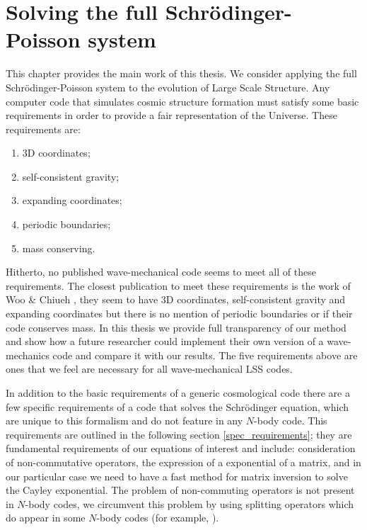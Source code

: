 %
\newpage
\chapter{Solving the full Schr\"odinger-Poisson system}
\label{ch_5}
This chapter provides the main work of this thesis. We consider applying the full Schr\"odinger-Poisson system to the evolution of Large Scale Structure. Any computer code that simulates cosmic structure formation must satisfy some basic requirements in order to provide a fair representation of the Universe. These requirements are:

\begin{enumerate}
\item 3D coordinates;
\item self-consistent gravity; 
\item expanding coordinates;
\item periodic boundaries;
\item mass conserving.
\end{enumerate}

\noindent Hitherto, no published wave-mechanical code seems to meet all of these requirements. The closest publication to meet these requirements is the work of Woo \& Chiueh \citep{bib_wooc}, they seem to have 3D coordinates, self-consistent gravity and expanding coordinates but there is no mention of periodic boundaries or if their code conserves mass. In this thesis we provide full transparency of our method and show how a future researcher could implement their own version of a wave-mechanics code and compare it with our results. The five requirements above are ones that we feel are necessary for all wave-mechanical LSS codes.

In addition to the basic requirements of a generic cosmological code there are a few specific requirements of a code that solves the Schr\"odinger equation, which are unique to this formalism and do not feature in any $N$-body code. This requirements are outlined in the following section \ref{spec_requirements}; they are fundamental requirements of our equations of interest and include: consideration of non-commutative operators, the expression of a exponential of a matrix, and in our particular case we need to have a fast method for matrix inversion to solve the Cayley exponential. The problem of non-commuting operators is not present in $N$-body codes, we circumvent this problem by using splitting operators which do appear in some $N$-body codes (for example, \citet{bib_spr}).

